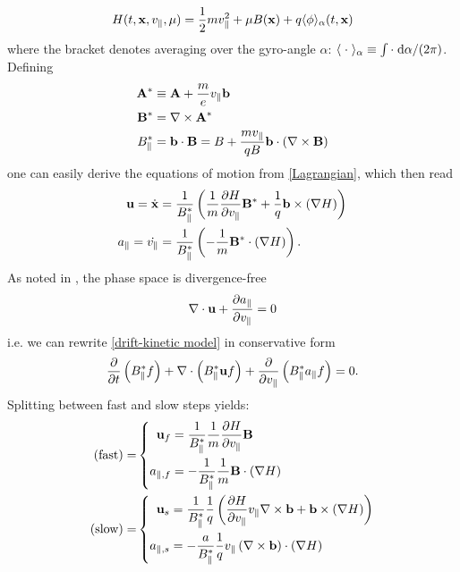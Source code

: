 \begin{equation}
	H(t, \mathbf{x}, v_\parallel, \mu) = \frac{1}{2} m v_\parallel^2 + \mu B(\mathbf{x}) + q \langle \phi \rangle_\alpha (t,\mathbf{x})
\end{equation}
where the bracket denotes averaging over the gyro-angle $\alpha$: $\langle \;\cdot\; \rangle_\alpha \equiv \int \cdot\;\text{d} \alpha / (2\pi)$.\\
Defining
\begin{subequations}
	\begin{align}
		\mathbf{A}^\ast & \equiv \mathbf{A} + \frac{m}{e} v_\parallel \mathbf{b} \\
		\mathbf{B}^\ast & = \nabla \times \mathbf{A}^\ast \\
		B_\parallel^\ast & = \mathbf{b} \cdot \mathbf{B} = B + \frac{m v_\parallel}{q B} \mathbf{b} \cdot \left( \nabla \times \mathbf{B} \right)
	\end{align}
\end{subequations}
one can easily derive the equations of motion from \eqref{Lagrangian}, which then read
\begin{subequations}
	\begin{align}
		\mathbf{u} = \dot{\mathbf{x}} & = \frac{1}{B_\parallel^\ast} \left( \frac{1}{m} \frac{\partial H}{\partial v_\parallel} \mathbf{B}^\ast + \frac{1}{q} \mathbf{b} \times \left(\nabla H\right) \right) \label{eom for bu} \\
		a_\parallel = \dot{v_\parallel} & = \frac{1}{B_\parallel^\ast} \left( -\frac{1}{m} \mathbf{B}^\ast \cdot \left( \nabla H \right) \right). \label{eom for ap}
	\end{align}
\end{subequations}
As noted in \cite{Latu_2017}, the phase space is divergence-free
\begin{equation}
	\nabla \cdot \mathbf{u} + \frac{\partial a_\parallel}{\partial v_\parallel} = 0
\end{equation}
i.e. we can rewrite \eqref{drift-kinetic model} in conservative form
\begin{equation}\label{conservation1}
	\frac{\partial }{\partial t}\left(B_\parallel^\ast f\right) + \nabla\cdot\left( B_\parallel^\ast \mathbf{u} f \right) + \frac{\partial }{\partial v_\parallel} \left( B_\parallel^\ast a_\parallel f \right) = 0.
\end{equation}
Splitting between fast and slow steps yields:
\begin{subequations}
	\begin{align}
		(\text{fast}) = & \left\{ \begin{aligned}
			\mathbf{u}_f & = \frac{1}{B_\parallel^\ast} \frac{1}{m} \frac{\partial H}{\partial v_\parallel} \mathbf{B} \\
			a_{\parallel, f} & = -\frac{1}{B_\parallel^\ast} \frac{1}{m} \mathbf{B} \cdot \left( \nabla H \right)
		\end{aligned} \right. \label{split step fast}\\
		(\text{slow}) = &  \left\{ \begin{aligned}
			\mathbf{u}_s & = \frac{1}{B_\parallel^\ast} \frac{1}{q} \left( \frac{\partial H}{\partial v_\parallel} v_\parallel \nabla \times \mathbf{b} + \mathbf{b} \times \left(\nabla H\right) \right) \\
			a_{\parallel, s} & = - \frac{a}{B_\parallel^\ast} \frac{1}{q} v_\parallel \left( \nabla \times \mathbf{b} \right) \cdot \left( \nabla H \right)
		\end{aligned} \right. \label{split step slow}
	\end{align}
\end{subequations}

